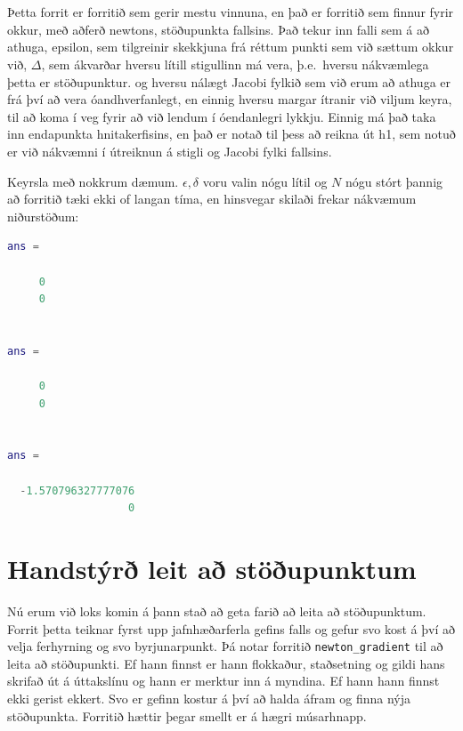 \documentclass[a4]{article}
\begin{document}
\begin{flushright}
\section{}
Þetta forrit er forritið sem gerir mestu vinnuna, en það er forritið sem finnur fyrir okkur, með aðferð newtons, stöðupunkta fallsins. Það tekur inn falli sem á að athuga,
epsilon, sem tilgreinir skekkjuna frá réttum punkti sem við sættum okkur við,
$\Delta$, sem ákvarðar hversu lítill stigullinn má vera, þ.e.\ hversu nákvæmlega þetta er stöðupunktur.
og hversu nálægt Jacobi fylkið sem við erum að athuga er frá því að vera óandhverfanlegt,
en einnig hversu margar ítranir við viljum keyra, til að koma í veg fyrir að við lendum í óendanlegri lykkju.
Einnig má það taka inn endapunkta hnitakerfisins, en það er notað til þess að reikna út h1, sem notuð er  við nákvæmni í útreiknun á stigli og Jacobi fylki fallsins.



Keyrsla með nokkrum dæmum. $\epsilon, \delta$ voru valin nógu lítil og $N$ nógu stórt þannig að forritið tæki ekki of langan tíma, en hinsvegar skilaði frekar nákvæmum niðurstöðum:


\begin{lstlisting}[language=Matlab]
ans =

     0
     0


ans =

     0
     0


ans =

  -1.570796327777076
                   0

\end{lstlisting}


\section{Handstýrð leit að stöðupunktum}

Nú erum við loks komin á þann stað að geta farið að leita að stöðupunktum. Forrit þetta teiknar fyrst upp jafnhæðarferla gefins falls og gefur svo kost á því að velja ferhyrning og svo byrjunarpunkt. Þá notar forritið \lstinline{newton_gradient} til að leita að stöðupunkti. Ef hann finnst er hann flokkaður, staðsetning og gildi hans skrifað út á úttakslínu og hann er merktur inn á myndina. Ef hann hann finnst ekki gerist ekkert. Svo er gefinn kostur á því að halda áfram og finna nýja stöðupunkta. Forritið hættir þegar smellt er á hægri músarhnapp.


\end{flushright}
\end{document}
